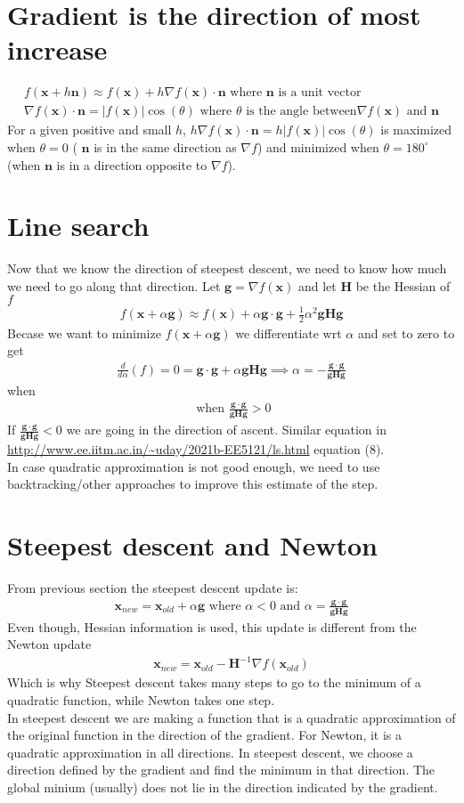 \documentclass{article}
\newcommand{\ber}{\begin{eqnarray}}
\newcommand{\eer}{\end{eqnarray}}
\newcommand{\dd}[2]{\frac{d}{d{#2}}{(#1)} }
\begin{document}
\section{Gradient is the direction of most increase}
\ber
f(\pmb{x} + h\pmb{n}) \approx f(\pmb{x}) + h\nabla{f(\pmb{x})}\cdot\pmb{n} \text{ where } \pmb{n} \text{ is a unit vector} \\
\nabla{f(\pmb{x})}\cdot\pmb{n} = |f(\pmb{x})|\cos(\theta) \text{ where } \theta \text{ is the angle between} \nabla{}f(\pmb{x}) \text{ and } \pmb{n} 
\eer
For a given positive and small $h$, $h\nabla{f(\pmb{x})}\cdot\pmb{n} = h|f(\pmb{x})|\cos(\theta) $ is maximized when $\theta=0$ ( $\pmb{n}$ is in the same direction as $\nabla{f}$) and minimized when $\theta=180^{\circ}$ (when $\pmb{n}$ is in a direction opposite to $\nabla{}f$).
%
%
%
\section{Line search}
Now that we know the direction of steepest descent, we need to know how much we need to go along that direction. Let $\pmb{g}=\nabla{}f(\pmb{x})$ and let $\pmb{H}$ be the Hessian of $f$
\ber
f(\pmb{x} + \alpha\pmb{g}) \approx f(\pmb{x}) + \alpha\pmb{g}\cdot\pmb{g} + \frac{1}{2}\alpha^2\pmb{g}\pmb{H}\pmb{g}
\eer
Becase we want to minimize $f(\pmb{x} + \alpha\pmb{g})$ we differentiate wrt $\alpha$ and set to zero to get
\ber
\dd{f}{\alpha} = 0 = \pmb{g}\cdot\pmb{g} + \alpha\pmb{g}\pmb{H}\pmb{g} \implies \alpha = -\frac{\pmb{g}\cdot\pmb{g}}{\pmb{g}\pmb{H}\pmb{g}} 
\eer
when
\ber
\text{ when }\frac{\pmb{g}\cdot\pmb{g}}{\pmb{g}\pmb{H}\pmb{g}} > 0
\eer
If $\frac{\pmb{g}\cdot\pmb{g}}{\pmb{g}\pmb{H}\pmb{g}}<0$ we are going in the direction of ascent.
Similar equation in \url{http://www.ee.iitm.ac.in/~uday/2021b-EE5121/ls.html} equation (8). \\
In case quadratic approximation is not good enough, we need to use backtracking/other approaches to improve this estimate of the step.
%
%
\section{Steepest descent and Newton}
From previous section the steepest descent update is:
\ber
\pmb{x}_{new} = \pmb{x}_{old} + \alpha\pmb{g} \text{ where } \alpha < 0 \text{ and }  \alpha = \frac{\pmb{g}\cdot\pmb{g}}{\pmb{g}\pmb{H}\pmb{g}}
\eer
Even though, Hessian information is used, this update is different from the Newton update
\ber
\pmb{x}_{new} = \pmb{x}_{old} - \pmb{H}^{-1}\nabla{f(\pmb{x}_{old})}
\eer
Which is why Steepest descent takes many steps to go to the minimum of a quadratic function, while Newton takes one step.\\
In steepest descent we are making a function that is a quadratic approximation of the original function in the direction of the gradient. For Newton, it is a quadratic approximation in all directions. In steepest descent, we choose a direction defined by the gradient and find the minimum in that direction. The global minium (usually) does not lie in the direction indicated by the gradient. \\
%
%
%
\end{document}
